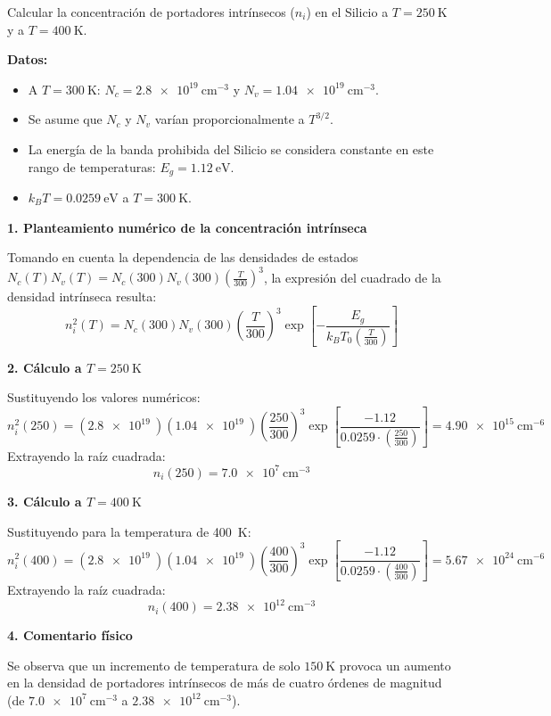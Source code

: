 \newpage

\begin{ejemplo}
Calcular la concentración de portadores intrínsecos ($n_i$) en el Silicio a $T = \SI{250}{\kelvin}$ y a $T = \SI{400}{\kelvin}$.

\textbf{Datos:}
\begin{itemize}
    \item A $T = \SI{300}{\kelvin}$: $N_c = \SI{2.8e19}{\cm^{-3}}$ y $N_v = \SI{1.04e19}{\cm^{-3}}$.
    \item Se asume que $N_c$ y $N_v$ varían proporcionalmente a $T^{3/2}$.
    \item La energía de la banda prohibida del Silicio se considera constante en este rango de temperaturas: $E_g = \SI{1.12}{\eV}$.
    \item $k_B T = \SI{0.0259}{\eV}$ a $T = \SI{300}{\kelvin}$.
\end{itemize}

\tcblower

\textbf{1. Planteamiento numérico de la concentración intrínseca}

Tomando en cuenta la dependencia de las densidades de estados $N_c(T) N_v(T) = N_c(300) N_v(300) \left( \frac{T}{300} \right)^3$, la expresión del cuadrado de la densidad intrínseca resulta:
\[
n_i^2(T) = N_c(300) N_v(300) \left( \frac{T}{300} \right)^3 \exp\left[ -\frac{E_g}{k_B T_0 \left(\frac{T}{300}\right)} \right]
\]

\textbf{2. Cálculo a $T = \SI{250}{\kelvin}$}

Sustituyendo los valores numéricos:
\[
n_i^2(250) = (\SI{2.8e19}{}) (\SI{1.04e19}{}) \left( \frac{250}{300} \right)^3 \exp\left[ \frac{-1.12}{0.0259 \cdot \left(\frac{250}{300}\right)} \right] = \SI{4.90e15}{\cm^{-6}}
\]
Extrayendo la raíz cuadrada:
\[
n_i(250) = \SI{7.0e7}{\cm^{-3}}
\]

\textbf{3. Cálculo a $T = \SI{400}{\kelvin}$}

Sustituyendo para la temperatura de \SI{400}{\kelvin}:
\[
n_i^2(400) = (\SI{2.8e19}{}) (\SI{1.04e19}{}) \left( \frac{400}{300} \right)^3 \exp\left[ \frac{-1.12}{0.0259 \cdot \left(\frac{400}{300}\right)} \right] = \SI{5.67e24}{\cm^{-6}}
\]
Extrayendo la raíz cuadrada:
\[
n_i(400) = \SI{2.38e12}{\cm^{-3}}
\]

\textbf{4. Comentario físico}

Se observa que un incremento de temperatura de solo $\SI{150}{\kelvin}$ provoca un aumento en la densidad de portadores intrínsecos de más de cuatro órdenes de magnitud (de $\SI{7.0e7}{\cm^{-3}}$ a $\SI{2.38e12}{\cm^{-3}}$).
\end{ejemplo}

